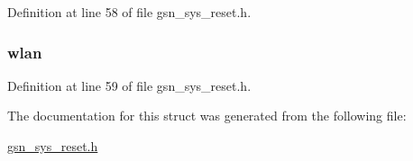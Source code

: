 Definition at line 58 of file gsn\_\-sys\_\-reset.h.

\hypertarget{a00257_a57220e8a2737550385ffa2aea52ff301}{
\subsubsection[{wlan}]{ {\bf wlan}}}
\label{a00257_a57220e8a2737550385ffa2aea52ff301}


Definition at line 59 of file gsn\_\-sys\_\-reset.h.



The documentation for this struct was generated from the following file:\begin{DoxyCompactItemize}
\item 
\hyperlink{a00594}{gsn\_\-sys\_\-reset.h}\end{DoxyCompactItemize}
